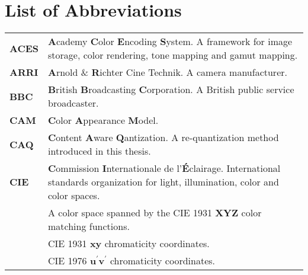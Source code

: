 \chapter*{List of Abbreviations}
%
\begin{flushleft}
%
%




\renewcommand*{\arraystretch}{1.75}
\begin{longtable}[c]{@{}p{28.5mm}@{} p{120.5mm}}
	\textbf{ACES}	& \textbf{A}cademy \textbf{C}olor \textbf{E}ncoding \textbf{S}ystem. A framework for image storage, color rendering, tone mapping and gamut mapping.\\
	\textbf{ARRI}	& \textbf{A}rnold \& \textbf{R}ichter Cine Technik. A camera manufacturer.\\
	\textbf{BBC}    & \textbf{B}ritish \textbf{B}roadcasting \textbf{C}orporation. A British public service broadcaster.\\
	\textbf{CAM}	& \textbf{C}olor \textbf{A}ppearance \textbf{M}odel.\\
	\textbf{CAQ}	& \textbf{C}ontent \textbf{A}ware \textbf{Q}antization. A re-quantization method introduced in this thesis.\\
	\textbf{CIE}	& \textbf{C}ommission \textbf{I}nternationale de l'\textbf{É}clairage. International standards organization for light, illumination, color and color spaces.\\
	\textbf{\XYZ}	& A color space spanned by the CIE 1931 \textbf{XYZ} color matching functions.\\
	\textbf{\xy}	& CIE 1931 \textbf{xy} chromaticity coordinates.\\
	\textbf{\uv}	& CIE 1976 \textbf{u$^\prime$v$^\prime$} chromaticity coordinates.\\

\end{longtable}
\end{flushleft}
